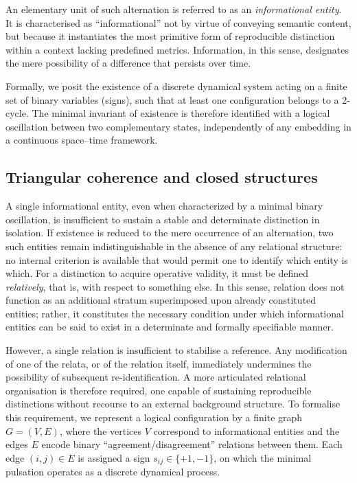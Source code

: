 \documentclass[11pt,a4paper]{article}
\begin{document}
An elementary unit of such alternation is referred to as an \emph{informational entity}. It is characterised as “informational” not by virtue of conveying semantic content, but because it instantiates the most primitive form of reproducible distinction within a context lacking predefined metrics. Information, in this sense, designates the mere possibility of a difference that persists over time. 

Formally, we posit the existence of a discrete dynamical system acting on a finite set of binary variables (signs), such that at least one configuration belongs to a 2-cycle. The minimal invariant of existence is therefore identified with a logical oscillation between two complementary states, independently of any embedding in a continuous space–time framework.

\subsection{Triangular coherence and closed structures}

A single informational entity, even when characterized by a minimal binary oscillation, is insufficient to sustain a stable and determinate distinction in isolation. If existence is reduced to the mere occurrence of an alternation, two such entities remain indistinguishable in the absence of any relational structure: no internal criterion is available that would permit one to identify which entity is which. For a distinction to acquire operative validity, it must be defined \emph{relatively}, that is, with respect to something else. In this sense, relation does not function as an additional stratum superimposed upon already constituted entities; rather, it constitutes the necessary condition under which informational entities can be said to exist in a determinate and formally specifiable manner.

However, a single relation is insufficient to stabilise a reference. Any modification of one of the relata, or of the relation itself, immediately undermines the possibility of subsequent re-identification. A more articulated relational organisation is therefore required, one capable of sustaining reproducible distinctions without recourse to an external background structure. To formalise this requirement, we represent a logical configuration by a finite graph \(G = (V,E)\), where the vertices \(V\) correspond to informational entities and the edges \(E\) encode binary “agreement/disagreement” relations between them. Each edge \((i,j) \in E\) is assigned a sign \(s_{ij} \in \{+1,-1\}\), on which the minimal pulsation operates as a discrete dynamical process.
\end{document}

